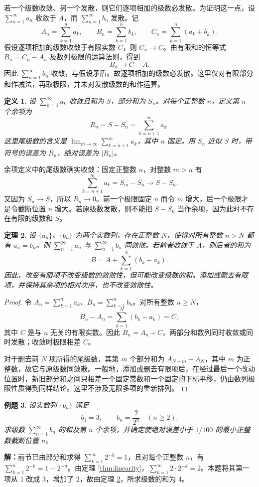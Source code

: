 \documentclass[UTF8,fontset=fandol,11pt]{ctexart}
\newtheorem{definition}{定义}[section]
\newtheorem{theorem}[definition]{定理}
\newtheorem{example}[definition]{例题}
\begin{document}
若一个级数收敛、另一个发散，则它们逐项相加的级数必发散。为证明这一点，设 $\sum_{n=1}^{\infty}a_n$ 收敛于 $A$，而 $\sum_{n=1}^{\infty}b_n$ 发散。记
\[
A_n=\sum_{k=1}^{n}a_k,\qquad B_n=\sum_{k=1}^{n}b_k,\qquad C_n=\sum_{k=1}^{n}(a_k+b_k).
\]
假设逐项相加的级数收敛于有限实数 $C$，则 $C_n\to C$。由有限和的恒等式 $B_n=C_n-A_n$ 及数列极限的运算法则，得到
\[
B_n\longrightarrow C-A.
\]
因此 $\sum_{n=1}^{\infty}b_n$ 收敛，与假设矛盾。故逐项相加的级数必发散。这里仅对有限部分和作减法，再取极限，并未对发散级数的和作运算。\par
\begin{definition}
\label{def:remainder}设 $\sum_{k=1}^{\infty}a_k$ 收敛且和为 $S$，部分和为 $S_n$。对每个正整数 $n$，定义第 $n$ 个余项为
\[
R_n=S-S_n=\sum_{k=n+1}^{\infty}a_k.
\]
这里尾级数的含义是 $\lim_{m\to\infty}\sum_{k=n+1}^{m}a_k$，其中 $n$ 固定。用 $S_n$ 近似 $S$ 时，带符号的误差为 $R_n$，绝对误差为 $|R_n|$。
\end{definition}
余项定义中的尾级数确实收敛：固定正整数 $n$，对整数 $m>n$ 有
\[
\sum_{k=n+1}^{m}a_k=S_m-S_n\longrightarrow S-S_n.
\]
又因为 $S_n\to S$，所以 $R_n\to0$。前一个极限固定 $n$ 而令 $m$ 增大，后一个极限才是令截断位置 $n$ 增大。若原级数发散，则不能把 $S-S_n$ 当作余项，因为此时不存在有限的级数和 $S$。\par
\begin{theorem}
\label{thm:finite-change}设 $\{a_n\}$、$\{b_n\}$ 为两个实数列，存在正整数 $N$，使得对所有整数 $n>N$ 都有 $a_n=b_n$。则 $\sum_{n=1}^{\infty}a_n$ 与 $\sum_{n=1}^{\infty}b_n$ 同敛散。若前者收敛于 $A$，则后者的和为
\[
B=A+\sum_{k=1}^{N}(b_k-a_k).
\]
因此，改变有限项不改变级数的敛散性，但可能改变级数的和。添加或删去有限项，并保持其余项的相对次序，也不改变敛散性。
\end{theorem}
\begin{proof}
令 $A_n=\sum_{k=1}^{n}a_k$、$B_n=\sum_{k=1}^{n}b_k$。对所有整数 $n\geq N$，
\[
B_n-A_n=\sum_{k=1}^{N}(b_k-a_k)=C,
\]
其中 $C$ 是与 $n$ 无关的有限实数。因此 $B_n=A_n+C$，两部分和数列同时收敛或同时发散；收敛时极限相差 $C$。

对于删去前 $N$ 项所得的尾级数，其第 $m$ 个部分和为 $A_{N+m}-A_N$，其中 $m$ 为正整数，故它与原级数同敛散。一般地，添加或删去有限项后，在经过最后一个改动位置时，新旧部分和之间只相差一个固定常数和一个固定的下标平移，仍由数列极限性质得到同样结论。这里不涉及无限多项的重新排列。
\end{proof}
\begin{example}
设实数列 $\{b_n\}$ 满足
\[
b_1=3,\qquad b_n=\frac{2}{2^n}\quad(n\geq2).
\]
求级数 $\sum_{n=1}^{\infty}b_n$ 的和及第 $n$ 个余项，并确定使绝对误差小于 $1/100$ 的最小正整数截断位置 $n$。
\end{example}
\par\noindent\textbf{解：}前节已由部分和求得 $\sum_{k=1}^{\infty}2^{-k}=1$，且对每个正整数 $n$，有 $\sum_{k=1}^{n}2^{-k}=1-2^{-n}$。由定理 \ref{thm:linearity}，$\sum_{k=1}^{\infty}2\cdot2^{-k}=2$。本题将其第一项从 $1$ 改成 $3$，增加了 $2$，故由定理 \ref{thm:finite-change}，所求级数的和为 $4$。
\end{document}
